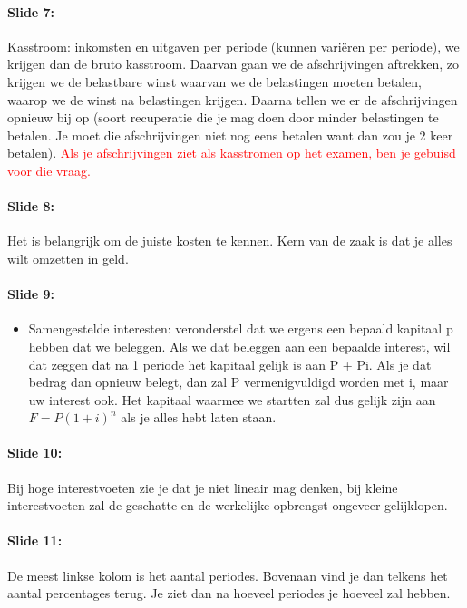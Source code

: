 \documentclass[10pt,a4paper]{report}
\begin{document}
\paragraph{Slide 7:} Kasstroom: inkomsten en uitgaven per periode (kunnen vari\"eren per periode), we krijgen dan de bruto kasstroom. Daarvan gaan we de afschrijvingen aftrekken, zo krijgen we de belastbare winst waarvan we de belastingen moeten betalen, waarop we de winst na belastingen krijgen. Daarna tellen we er de afschrijvingen opnieuw bij op (soort recuperatie die je mag doen door minder belastingen te betalen. Je moet die afschrijvingen niet nog eens betalen want dan zou je 2 keer betalen). \textcolor{red}{Als je afschrijvingen ziet als kasstromen op het examen, ben je gebuisd voor die vraag.}

\paragraph{Slide 8:} Het is belangrijk om de juiste kosten te kennen. Kern van de zaak is dat je alles wilt omzetten in geld.

\paragraph{Slide 9:}
\begin{itemize}
\item Samengestelde interesten: veronderstel dat we ergens een bepaald kapitaal p hebben dat we beleggen. Als we dat beleggen aan een bepaalde interest, wil dat zeggen dat na 1 periode het kapitaal gelijk is aan P + Pi. Als je dat bedrag dan opnieuw belegt, dan zal P vermenigvuldigd worden met i, maar uw interest ook. Het kapitaal waarmee we startten zal dus gelijk zijn aan $F = P(1+i)^{n}$ als je alles hebt laten staan.
\end{itemize}
\paragraph{Slide 10:} Bij hoge interestvoeten zie je dat je niet lineair mag denken, bij kleine interestvoeten zal de geschatte en de werkelijke opbrengst ongeveer gelijklopen.

\paragraph{Slide 11:} De meest linkse kolom is het aantal periodes. Bovenaan vind je dan telkens het aantal percentages terug. Je ziet dan na hoeveel periodes je hoeveel zal hebben.
\end{document}
